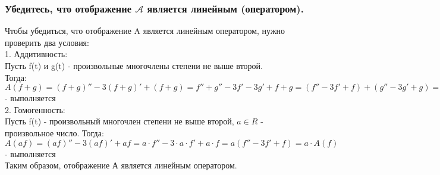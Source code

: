 \documentclass{article}
\begin{document}
    \subsubsection{Убедитесь, что отображение $\mathcal{A}$ является линейным (оператором).}
    Чтобы убедиться, что отображение A является линейным оператором,
    нужно проверить два условия: \\
    1. Аддитивность:\\
    Пусть f(t) и g(t) - произвольные многочлены степени не выше второй.\\
    Тогда:\\
    $A(f + g) = (f + g)'' - 3(f + g)' + (f + g) = f '' + g'' - 3f ' - 3g' + f + g = (f '' - 3f ' + f) + (g'' -
    3g' + g) = A(f) + A(g)$ - выполняется\\
    2. Гомогенность:\\
    Пусть f(t) - произвольный многочлен степени не выше второй, $a \in R$ -
    произвольное число. Тогда:\\
    $A(af) = (af)'' - 3(af)' + af = a \cdot  f '' - 3 \cdot  a  \cdot  f ' + a \cdot  f = a(f '' - 3f ' + f) = a \cdot  A(f)$ -
    выполняется\\
    Таким образом, отображение А является линейным оператором.\\
    
\end{document}
